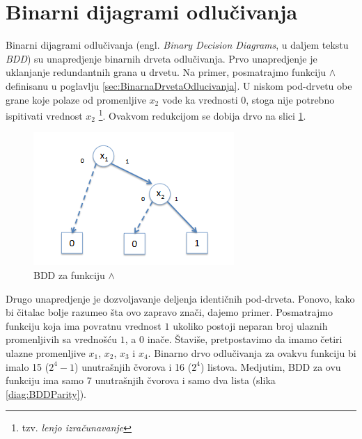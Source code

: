 \section{Binarni dijagrami odlu\v{c}ivanja}
\label{sec:BDD}

Binarni dijagrami odlu\v{c}ivanja (engl. \emph{Binary Decision Diagrams}, u daljem tekstu \emph{BDD}) su unapredjenje binarnih drveta odlu\v{c}ivanja. Prvo unapredjenje je uklanjanje redundantnih grana u drvetu. Na primer, posmatrajmo funkciju $\wedge$ definisanu u poglavlju \ref{sec:BinarnaDrvetaOdlucivanja}. U niskom pod-drvetu obe grane koje polaze od promenljive $x_{2}$ vode ka vrednosti $0$, stoga nije potrebno ispitivati vrednost $x_{2}$ \footnote{tzv. \emph{lenjo izra\v{c}unavanje}}. Ovakvom redukcijom se dobija drvo na slici \ref{diag:BDDAnd}.

\begin{figure}[H]
    \centering
    \includegraphics[scale=0.8]{slike/BDD_And.PNG}
    \caption{BDD za funkciju $\wedge$}
    \label{diag:BDDAnd}
\end{figure}

Drugo unapredjenje je dozvoljavanje deljenja identi\v{c}nih pod-drveta. Ponovo, kako bi \v{c}italac bolje razumeo \v{s}ta ovo zapravo zna\v{c}i, dajemo primer. Posmatrajmo funkciju koja ima povratnu vrednost $1$ ukoliko postoji neparan broj ulaznih promenljivih sa vredno\v{s}\'c{}u $1$, a $0$ ina\v{c}e. \v{S}tavi\v{s}e, pretpostavimo da imamo \v{c}etiri ulazne promenljive $x_{1}$, $x_{2}$, $x_{3}$ i $x_{4}$. Binarno drvo odlu\v{c}ivanja za ovakvu funkciju bi imalo 15 ($2^4 - 1$) unutra\v{s}njih \v{c}vorova i 16 ($2^4$) listova. Medjutim, BDD za ovu funkciju ima samo 7 unutra\v{s}njih \v{c}vorova i samo dva lista (slika \ref{diag:BDDParity}).

